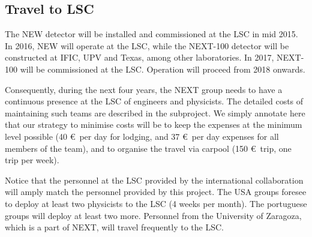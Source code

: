 \subsection{Travel to LSC}
The NEW detector will be installed and commissioned at the LSC in mid 2015. In 2016, NEW will operate at the LSC, while the NEXT-100 detector will be constructed at IFIC, UPV and Texas, among other laboratories. In 2017, NEXT-100 will be commissioned at the LSC. Operation will proceed from 2018 onwards.

Consequently, during the next four years, the NEXT group needs to have a continuous presence at the LSC of engineers and physicists. The detailed costs of maintaining such teams are described in the subproject. We simply annotate here that our strategy to minimise costs will be to keep the expenses at the minimum level possible (40 \euro\ per day for lodging, and 37 \euro\ per day expenses for all members of the team), and to organise the travel via carpool (150 \euro\ trip, one trip per week). 


Notice that the personnel at the LSC provided by the international collaboration will amply match the personnel provided by this project. The USA groups foresee to deploy at least two physicists to the LSC (4 weeks per month). The portuguese groups will deploy at least two more. Personnel from the University of Zaragoza, which is a part of NEXT, will travel frequently to the LSC. 

